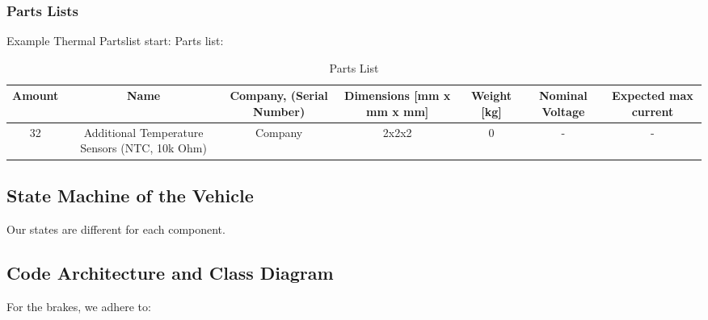 \subsubsection{Parts Lists}
Example Thermal Partslist start:
Parts list:
\begin{table}[h]
    \centering
    \caption{Parts List}
        \begin{adjustbox}{width=\textwidth,center}
    \begin{tabular}{|c|c|c|c|c|c|c|}
        \hline
        \textbf{Amount} & \textbf{Name} & \textbf{Company, (Serial Number)} & \textbf{Dimensions [mm x mm x mm]} & \textbf{Weight [kg]} & \textbf{Nominal Voltage} & \textbf{Expected max current} \\
        \hline
        32 & Additional Temperature Sensors (NTC, 10k Ohm) & Company & 2x2x2 & 0 & - & - \\
    \end{tabular}
        \end{adjustbox}
\end{table}


\subsection{State Machine of the Vehicle}

Our states are different for each component.

\subsection{Code Architecture and Class Diagram}
For the brakes, we adhere to: \\


